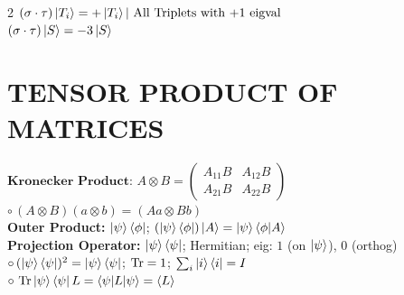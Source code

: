 \documentclass[10pt,a4paper]{article}
\begin{document}
\begin{multicols}{2}
$(\sigma\cdot\tau)\ket{T_i}=+\ket{T_i} | \text{ All Triplets with +1 eigval}$ \\
$(\sigma\cdot\tau)\ket{S}=-3\ket{S}$ \\

\section{TENSOR PRODUCT OF MATRICES}
$\textbf{Kronecker Product: } A \otimes B =  \begin{pmatrix}A_{11}B& A_{12}B \\ A_{21}B & A_{22}B\end{pmatrix}$ \\
$\circ\,(A \otimes B) (a \otimes b) = (Aa \otimes Bb)$\\
\textbf{Outer Product:} $\ket{\psi}\bra{\phi}$; $(\ket{\psi}\bra{\phi})\ket{A}=\ket{\psi}\langle\phi|A\rangle$ \\
\textbf{Projection Operator:} $\ket{\psi}\bra{\psi}$; Hermitian; eig: $1$ (on $\ket{\psi}$), $0$ (orthog) \\
$\circ\,(\ket{\psi}\bra{\psi})^2=\ket{\psi}\bra{\psi}$; $\Tr=1$; $\sum_i\ket{i}\bra{i}=I$\\
$\circ\,\Tr\ket{\psi}\bra{\psi}L = \langle\psi|L|\psi\rangle =  \langle L\rangle$\\


\end{multicols}
\end{document}
